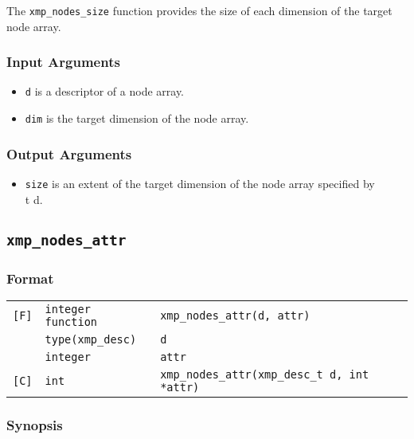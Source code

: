 The {\tt xmp\_nodes\_size} function provides the size of each dimension
of the target node array.

\subsubsection*{Input Arguments}

\begin{itemize}
 \item {\tt d} is a descriptor of a node array.
 \item {\tt dim} is the target dimension of the node array.
\end{itemize}

\subsubsection*{Output Arguments}

\begin{itemize}
 \item {\tt size} is an extent of the target dimension of the node array
       specified by {\\t d}.
\end{itemize}


\subsection{\tt xmp\_nodes\_attr}

\subsubsection*{Format}

\begin{tabular}{lll}

\verb![F]!& {\tt integer function}& {\tt xmp\_nodes\_attr(d, attr)}\\
          & {\tt type(xmp\_desc)} & {\tt d}\\
          & {\tt integer} & {\tt attr}\\

\verb![C]!&  {\tt int}& {\tt xmp\_nodes\_attr(xmp\_desc\_t d, int *attr)}\\

\end{tabular}

\subsubsection*{Synopsis}

